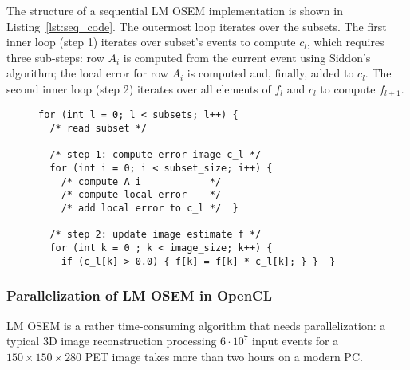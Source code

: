 The structure of a sequential LM OSEM implementation is shown in Listing~\ref{lst:seq_code}.
The outermost loop iterates over the subsets.
The first inner loop (step 1) iterates over subset's events to compute $c_l$, which requires three sub-steps:
row $A_i$ is computed from the current event using Siddon's algorithm;
the local error for row $A_i$ is computed and, finally, added to $c_l$.
The second inner loop (step 2) iterates over all elements of $f_l$ and $c_l$ to compute $f_{l+1}$.
\begin{figure}
\begin{lstlisting}[caption={Sequential code for LM OSEM comprises one outer loop with two nested inner loops.},label={lst:seq_code}]
for (int l = 0; l < subsets; l++) {
  /* read subset */

  /* step 1: compute error image c_l */
  for (int i = 0; i < subset_size; i++) {
    /* compute A_i            */
    /* compute local error    */
    /* add local error to c_l */  }

  /* step 2: update image estimate f */
  for (int k = 0 ; k < image_size; k++) {
    if (c_l[k] > 0.0) { f[k] = f[k] * c_l[k]; } }  }
\end{lstlisting}
\end{figure}

\subsubsection{Parallelization of LM OSEM in OpenCL}
\label{sec:parallel_implementation}
LM OSEM is a rather time-consuming algorithm that needs parallelization:
a typical 3D image reconstruction processing $6 \cdot 10^7$ input events for a $150 \times 150 \times 280$ PET image takes more than two hours on a modern PC.

